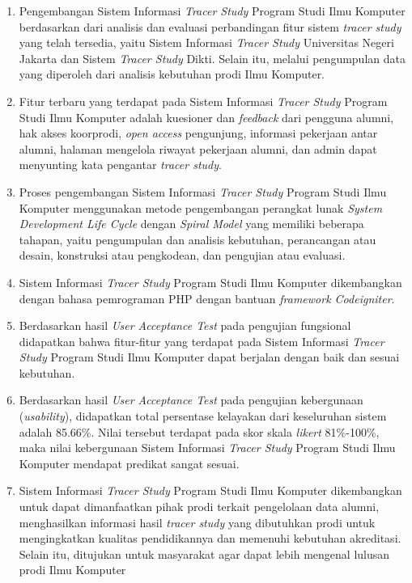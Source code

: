 \begin{enumerate}
	\item Pengembangan Sistem Informasi \textit{Tracer Study} Program Studi Ilmu Komputer berdasarkan dari analisis dan evaluasi perbandingan fitur sistem \textit{tracer study} yang telah tersedia, yaitu Sistem Informasi \textit{Tracer Study} Universitas Negeri Jakarta dan Sistem \textit{Tracer Study} Dikti. Selain itu, melalui pengumpulan data yang diperoleh dari analisis kebutuhan prodi Ilmu Komputer. 
	
	\item Fitur terbaru yang terdapat pada Sistem Informasi \textit{Tracer Study} Program Studi Ilmu Komputer adalah kuesioner dan \textit{feedback} dari pengguna alumni, hak akses koorprodi, \textit{open access} pengunjung, informasi pekerjaan antar alumni, halaman mengelola riwayat pekerjaan alumni, dan admin dapat menyunting kata pengantar \textit{tracer study}. 
	
	\item Proses pengembangan Sistem Informasi \textit{Tracer Study} Program Studi Ilmu Komputer menggunakan metode pengembangan perangkat lunak \textit{System Development Life Cycle} dengan \textit{Spiral Model} yang memiliki beberapa tahapan, yaitu pengumpulan dan analisis kebutuhan, perancangan atau desain, konstruksi atau pengkodean, dan pengujian atau evaluasi.
	
	\item Sistem Informasi \textit{Tracer Study} Program Studi Ilmu Komputer dikembangkan dengan bahasa pemrograman PHP dengan bantuan \textit{framework Codeigniter}. %
	
	\item Berdasarkan hasil \textit{User Acceptance Test} pada pengujian fungsional didapatkan bahwa fitur-fitur yang terdapat pada Sistem Informasi \textit{Tracer Study} Program Studi Ilmu Komputer dapat berjalan dengan baik dan sesuai kebutuhan.
	
	\item Berdasarkan hasil \textit{User Acceptance Test} pada pengujian kebergunaan (\textit{usability}), didapatkan total persentase kelayakan dari keseluruhan sistem adalah 85.66\%. Nilai tersebut terdapat pada skor skala \textit{likert} 81\%-100\%, maka nilai kebergunaan Sistem Informasi \textit{Tracer Study} Program Studi Ilmu Komputer mendapat predikat sangat sesuai.
	
	\item  Sistem Informasi \textit{Tracer Study} Program Studi Ilmu Komputer dikembangkan untuk dapat dimanfaatkan pihak prodi terkait pengelolaan data alumni, menghasilkan informasi hasil \textit{tracer study} yang dibutuhkan prodi untuk mengingkatkan kualitas pendidikannya dan memenuhi kebutuhan akreditasi. Selain itu, ditujukan untuk masyarakat agar dapat lebih mengenal lulusan prodi Ilmu Komputer

\end{enumerate}


